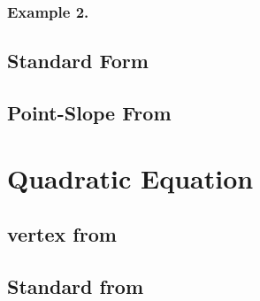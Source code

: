 \documentclass{article}
\begin{document}
        \subsubsection{Example 2.}
    \subsection{Standard Form}
    \subsection{Point-Slope From}
    
\section{Quadratic Equation}
    \subsection{vertex from}
    \subsection{Standard from}
\end{document}

